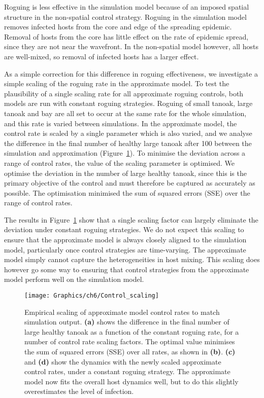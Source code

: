 Roguing is less effective in the simulation model because of an imposed spatial structure in the non-spatial control strategy. Roguing in the simulation model removes infected hosts from the core and edge of the spreading epidemic. Removal of hosts from the core has little effect on the rate of epidemic spread, since they are not near the wavefront. In the non-spatial model however, all hosts are well-mixed, so removal of infected hosts has a larger effect.

As a simple correction for this difference in roguing effectiveness, we investigate a simple scaling of the roguing rate in the approximate model. To test the plausibility of a single scaling rate for all approximate roguing controls, both models are run with constant roguing strategies. Roguing of small tanoak, large tanoak and bay are all set to occur at the same rate for the whole simulation, and this rate is varied between simulations. In the approximate model, the control rate is scaled by a single parameter which is also varied, and we analyse the difference in the final number of healthy large tanoak after \SI{100}{\years} between the simulation and approximation (Figure~\ref{fig:ch6:control_scaling}). To minimise the deviation across a range of control rates, the value of the scaling parameter is optimised. We optimise the deviation in the number of large healthy tanoak, since this is the primary objective of the control and must therefore be captured as accurately as possible. The optimisation minimised the sum of squared errors (SSE) over the range of control rates.

The results in Figure~\ref{fig:ch6:control_scaling} show that a single scaling factor can largely eliminate the deviation under constant roguing strategies. We do not expect this scaling to ensure that the approximate model is always closely aligned to the simulation model, particularly once control strategies are time-varying. The approximate model simply cannot capture the heterogeneities in host mixing. This scaling does however go some way to ensuring that control strategies from the approximate model perform well on the simulation model.

\begin{figure}[t]
    \begin{center}
        \texttt{[image: Graphics/ch6/Control\_scaling]}
        \caption[Scaling of control rates]{Empirical scaling of approximate model control rates to match simulation output. \textbf{(a)} shows the difference in the final number of large healthy tanoak as a function of the constant roguing rate, for a number of control rate scaling factors. The optimal value minimises the sum of squared errors (SSE) over all rates, as shown in \textbf{(b)}. \textbf{(c)} and \textbf{(d)} show the dynamics with the newly scaled approximate control rates, under a constant roguing strategy. The approximate model now fits the overall host dynamics well, but to do this slightly overestimates the level of infection.\label{fig:ch6:control_scaling}}
    \end{center}
\end{figure}

